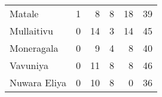 \begin{tabular}{lrrrrr}
Matale       &           1 &           8 &            8 &               18 &          39 \\
Mullaitivu   &           0 &          14 &            3 &               14 &          45 \\
Moneragala   &           0 &           9 &            4 &                8 &          40 \\
Vavuniya     &           0 &          11 &            8 &                8 &          46 \\
Nuwara Eliya &           0 &          10 &            8 &                0 &          36 \\
\bottomrule
\end{tabular}
